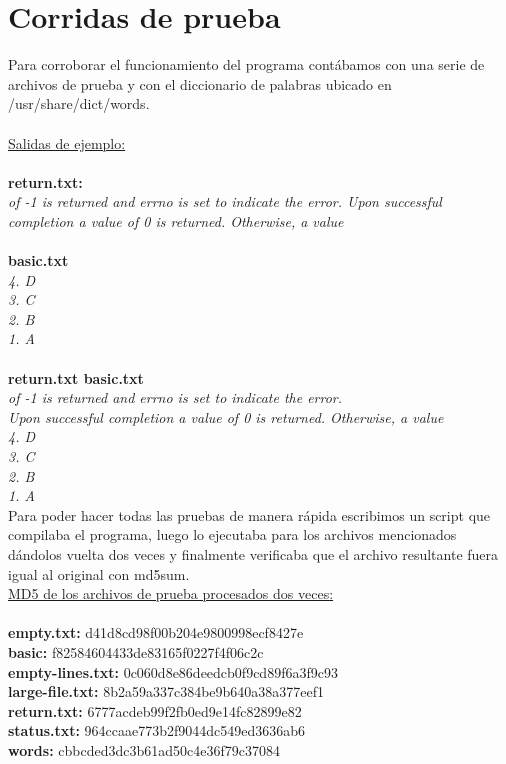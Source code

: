 \documentclass[a4paper,11pt]{article}
\begin{document}
\section{Corridas de prueba}
Para corroborar el funcionamiento del programa cont\'abamos con una serie de archivos de prueba y con el diccionario de palabras ubicado en /usr/share/dict/words. 
\\
\\
\underline{Salidas de ejemplo:}\\\\
\textbf{return.txt:}\\
\emph{of -1 is returned and errno is set to indicate the error.
Upon successful completion a value of 0 is returned. Otherwise, a value}
\\\\
\textbf{basic.txt}\\
\emph{4. D\\
3. C\\
2. B\\
1. A\\}\\
\textbf{return.txt basic.txt}\\
\emph{of -1 is returned and errno is set to indicate the error.\\
Upon successful completion a value of 0 is returned. Otherwise, a value\\
4. D\\
3. C\\
2. B\\
1. A}\\

Para poder hacer todas las pruebas de manera r\'apida escribimos un script que compilaba el programa, luego lo ejecutaba para los archivos mencionados d\'andolos vuelta dos veces y finalmente verificaba que el archivo resultante fuera igual al original con md5sum.\\ 

\underline{MD5 de los archivos de prueba procesados dos veces:}\\\\
\textbf{empty.txt:} d41d8cd98f00b204e9800998ecf8427e\\
\textbf{basic:} f82584604433de83165f0227f4f06c2c\\
\textbf{empty-lines.txt:} 0c060d8e86deedcb0f9cd89f6a3f9c93\\
\textbf{large-file.txt:} 8b2a59a337c384be9b640a38a377eef1\\
\textbf{return.txt:} 6777acdeb99f2fb0ed9e14fc82899e82\\
\textbf{status.txt:} 964ccaae773b2f9044dc549ed3636ab6\\
\textbf{words:} cbbcded3dc3b61ad50c4e36f79c37084\\
\end{document}
